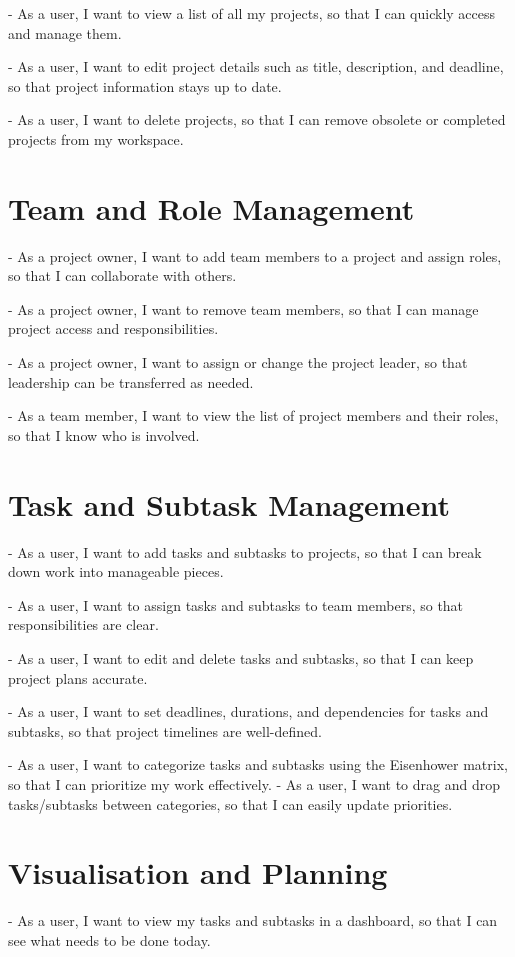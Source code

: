 \documentclass{report}
\begin{document}
- As a user, I want to view a list of all my projects, so that I can quickly access and manage them.

- As a user, I want to edit project details such as title, description, and deadline, so that project information stays up to date.

- As a user, I want to delete projects, so that I can remove obsolete or completed projects from my workspace.

\section{Team and Role Management}
- As a project owner, I want to add team members to a project and assign roles, so that I can collaborate with others.

- As a project owner, I want to remove team members, so that I can manage project access and responsibilities.

- As a project owner, I want to assign or change the project leader, so that leadership can be transferred as needed.

- As a team member, I want to view the list of project members and their roles, so that I know who is involved.

\section{Task and Subtask Management}
- As a user, I want to add tasks and subtasks to projects, so that I can break down work into manageable pieces.

- As a user, I want to assign tasks and subtasks to team members, so that responsibilities are clear.

- As a user, I want to edit and delete tasks and subtasks, so that I can keep project plans accurate.

- As a user, I want to set deadlines, durations, and dependencies for tasks and subtasks, so that project timelines are well-defined.

- As a user, I want to categorize tasks and subtasks using the Eisenhower matrix, so that I can prioritize my work effectively.
- As a user, I want to drag and drop tasks/subtasks between categories, so that I can easily update priorities.

\section{Visualisation and Planning}
- As a user, I want to view my tasks and subtasks in a dashboard, so that I can see what needs to be done today.
\end{document}
